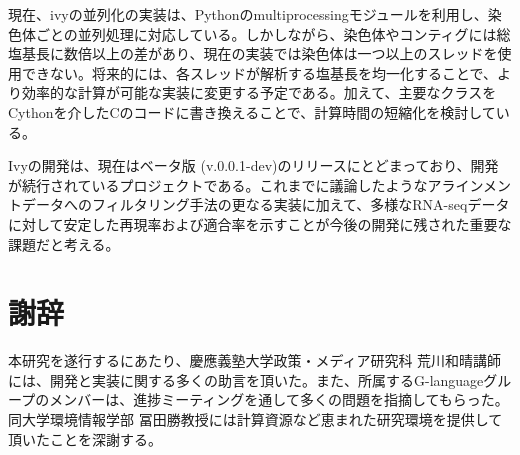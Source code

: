 \par
現在、ivyの並列化の実装は、Pythonのmultiprocessingモジュールを利用し、染色体ごとの並列処理に対応している。しかしながら、染色体やコンティグには総塩基長に数倍以上の差があり、現在の実装では染色体は一つ以上のスレッドを使用できない。将来的には、各スレッドが解析する塩基長を均一化することで、より効率的な計算が可能な実装に変更する予定である。加えて、主要なクラスをCythonを介したCのコードに書き換えることで、計算時間の短縮化を検討している。
\par
Ivyの開発は、現在はベータ版 (v.0.0.1-dev)のリリースにとどまっており、開発が続行されているプロジェクトである。これまでに議論したようなアラインメントデータへのフィルタリング手法の更なる実装に加えて、多様なRNA-seqデータに対して安定した再現率および適合率を示すことが今後の開発に残された重要な課題だと考える。

\section*{謝辞}
本研究を遂行するにあたり、慶應義塾大学政策・メディア研究科 荒川和晴講師には、開発と実装に関する多くの助言を頂いた。また、所属するG-languageグループのメンバーは、進捗ミーティングを通して多くの問題を指摘してもらった。同大学環境情報学部 冨田勝教授には計算資源など恵まれた研究環境を提供して頂いたことを深謝する。

\begin{bib}[100]

\end{bib}

